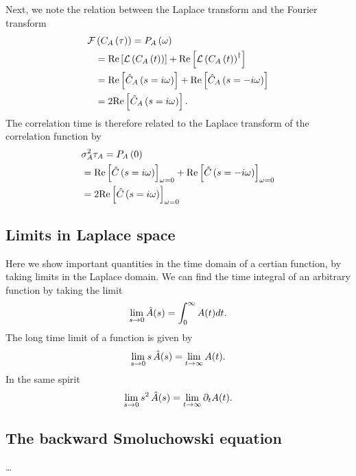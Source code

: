 Next, we note the relation between the Laplace transform and the Fourier transform
\begin{align}
\elabel{si:FT_of_corr}
{\cal F}&\br{C_A\br{\tau}}=P_A\br{\omega}\\
&={\rm Re}\sqbr{{\cal L}\br{C_A\br{t}}}+{\rm Re}\sqbr{{\cal L}\br{C_A\br{t}}^{\dagger}}\\
&={\rm Re}\sqbr{\hat{C}_A\br{s=i\omega}}+{\rm Re}\sqbr{\hat{C}_A\br{s=-i\omega}}\\
&=2{\rm Re}\sqbr{\hat{C}_A\br{s=i\omega}}.
\end{align}
The correlation time is therefore related to the Laplace transform of the correlation function by
\begin{align}
\elabel{si:laplace_corr_func_corr_time}
&\sigma_A^2\tau_A=P_A\br{0}\\
&={\rm Re}\sqbr{\hat{C}\br{s=i\omega}}_{\omega=0}+{\rm Re}\sqbr{\hat{C}\br{s=-i\omega}}_{\omega=0}\\
&=2{\rm Re}\sqbr{\hat{C}\br{s=i\omega}}_{\omega=0}
\end{align}

\subsection{ Limits in Laplace space}
Here we show important quantities in the time domain of a certian function, by taking limits in the Laplace domain. We can find the time integral of an arbitrary function by taking the limit
\begin{align}
\lim_{s \rightarrow 0} \hat{A}(s) = \int_0^\infty A(t) dt.
\elabel{si:int_vs_lap}
\end{align}
The long time limit of a function is given by
\begin{align}
\lim_{s \rightarrow 0} s \, \hat{A}(s) = \lim_{t \rightarrow \infty} A(t).
\elabel{si:longt_in_lap}
\end{align}
In the same spirit
\begin{align}
\lim_{s \rightarrow 0} s^2 \, \hat{A}(s) = \lim_{t \rightarrow \infty} \partial_t A(t).
\elabel{si:longt_in_lap2}
\end{align}

\subsection{ The backward Smoluchowski equation}
\ldots

